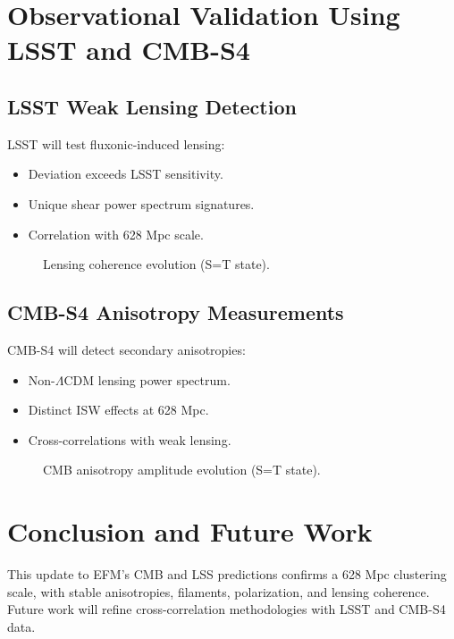 \documentclass[11pt]{article}
\begin{document}
\section{Observational Validation Using LSST and CMB-S4}
\subsection{LSST Weak Lensing Detection}
LSST will test fluxonic-induced lensing:
\begin{itemize}
    \item Deviation exceeds LSST sensitivity.
    \item Unique shear power spectrum signatures.
    \item Correlation with 628 Mpc scale.
\end{itemize}

\begin{figure}[ht]
    \centering
    \caption{Lensing coherence evolution (S=T state).}
    \label{fig:lens_val}
\end{figure}

\subsection{CMB-S4 Anisotropy Measurements}
CMB-S4 will detect secondary anisotropies:
\begin{itemize}
    \item Non-\(\Lambda\)CDM lensing power spectrum.
    \item Distinct ISW effects at 628 Mpc.
    \item Cross-correlations with weak lensing.
\end{itemize}

\begin{figure}[ht]
    \centering
    \caption{CMB anisotropy amplitude evolution (S=T state).}
    \label{fig:cmb_val}
\end{figure}

\section{Conclusion and Future Work}
This update to EFM’s CMB and LSS predictions confirms a 628 Mpc clustering scale, with stable anisotropies, filaments, polarization, and lensing coherence. Future work will refine cross-correlation methodologies with LSST and CMB-S4 data.
\end{document}
